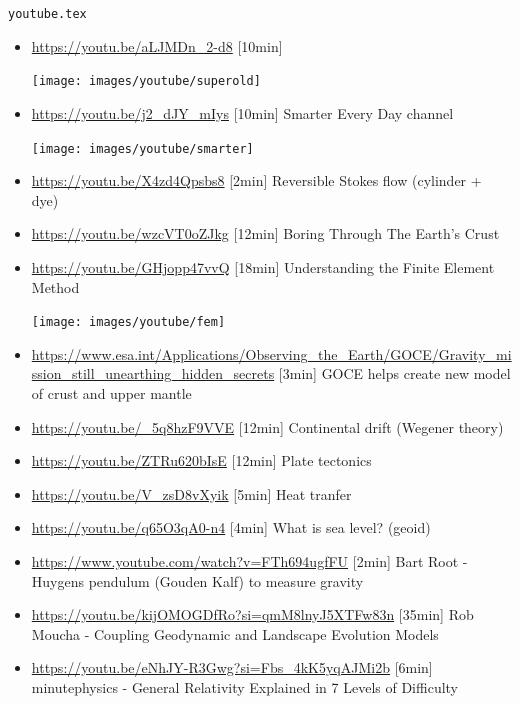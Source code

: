 \begin{flushright} {\tiny {\color{gray} \tt youtube.tex}} \end{flushright}

\begin{itemize}
\item \url{https://youtu.be/aLJMDn_2-d8} [10min]
\begin{center}
\texttt{[image: images/youtube/superold]}\\
\end{center}

\item \url{https://youtu.be/j2_dJY_mIys} [10min] Smarter Every Day channel
\begin{center}
\texttt{[image: images/youtube/smarter]}\\
\end{center}

\item \url{https://youtu.be/X4zd4Qpsbs8} [2min] Reversible Stokes flow (cylinder + dye)
\item \url{https://youtu.be/wzcVT0oZJkg} [12min] Boring Through The Earth's Crust
\item \url{https://youtu.be/GHjopp47vvQ} [18min] Understanding the Finite Element Method
\begin{center}
\texttt{[image: images/youtube/fem]}\\
\end{center}

\item \url{https://www.esa.int/Applications/Observing_the_Earth/GOCE/Gravity_mission_still_unearthing_hidden_secrets} [3min] GOCE helps create new model of crust and upper mantle
\item \url{https://youtu.be/_5q8hzF9VVE} [12min] Continental drift (Wegener theory) 
\item \url{https://youtu.be/ZTRu620bIsE} [12min] Plate tectonics
\item \url{https://youtu.be/V_zsD8vXyik} [5min] Heat tranfer 
\item \url{https://youtu.be/q65O3qA0-n4} [4min] What is sea level? (geoid) 

\item \url{https://www.youtube.com/watch?v=FTh694ugfFU} [2min] Bart Root - Huygens pendulum (Gouden Kalf) to measure gravity

\item \url{https://youtu.be/kijOMOGDfRo?si=qmM8lnyJ5XTFw83n} [35min] Rob Moucha - Coupling Geodynamic and Landscape Evolution Models
\item \url{https://youtu.be/eNhJY-R3Gwg?si=Fbs_4kK5yqAJMi2b} [6min] minutephysics - General Relativity Explained in 7 Levels of Difficulty 

\end{itemize}

